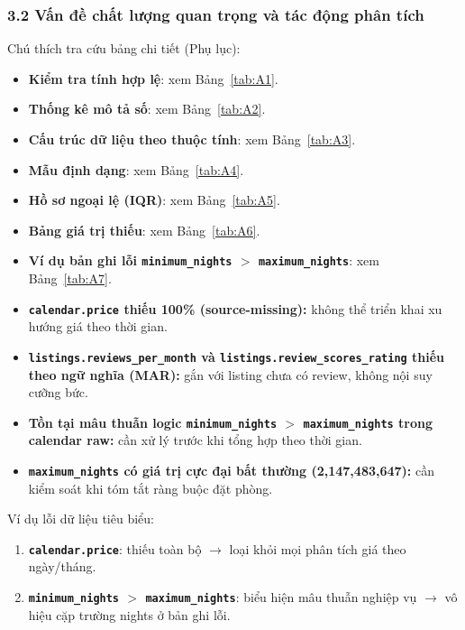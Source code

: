 \subsubsection*{3.2 Vấn đề chất lượng quan trọng và tác động phân tích}

Chú thích tra cứu bảng chi tiết (Phụ lục):

\begin{itemize}
    \item \textbf{Kiểm tra tính hợp lệ}: xem Bảng~\ref{tab:A1}.
    \item \textbf{Thống kê mô tả số}: xem Bảng~\ref{tab:A2}.
    \item \textbf{Cấu trúc dữ liệu theo thuộc tính}: xem Bảng~\ref{tab:A3}.
    \item \textbf{Mẫu định dạng}: xem Bảng~\ref{tab:A4}.
    \item \textbf{Hồ sơ ngoại lệ (IQR)}: xem Bảng~\ref{tab:A5}.
    \item \textbf{Bảng giá trị thiếu}: xem Bảng~\ref{tab:A6}.
    \item \textbf{Ví dụ bản ghi lỗi \texttt{minimum\_nights} $>$ \texttt{maximum\_nights}}: xem Bảng~\ref{tab:A7}.
    \item \textbf{\texttt{calendar.price} thiếu 100\% (source-missing):} không thể triển khai xu hướng giá theo thời gian.
    \item \textbf{\texttt{listings.reviews\_per\_month} và \texttt{listings.review\_scores\_rating} thiếu theo ngữ nghĩa (MAR):} gắn với listing chưa có review, không nội suy cưỡng bức.
    \item \textbf{Tồn tại mâu thuẫn logic \texttt{minimum\_nights} $>$ \texttt{maximum\_nights} trong calendar raw:} cần xử lý trước khi tổng hợp theo thời gian.
    \item \textbf{\texttt{maximum\_nights} có giá trị cực đại bất thường (2,147,483,647):} cần kiểm soát khi tóm tắt ràng buộc đặt phòng.
\end{itemize}

Ví dụ lỗi dữ liệu tiêu biểu:

\begin{enumerate}
    \item \textbf{\texttt{calendar.price}}: thiếu toàn bộ $\rightarrow$ loại khỏi mọi phân tích giá theo ngày/tháng.
    \item \textbf{\texttt{minimum\_nights} $>$ \texttt{maximum\_nights}}: biểu hiện mâu thuẫn nghiệp vụ $\rightarrow$ vô hiệu cặp trường nights ở bản ghi lỗi.
\end{enumerate}


